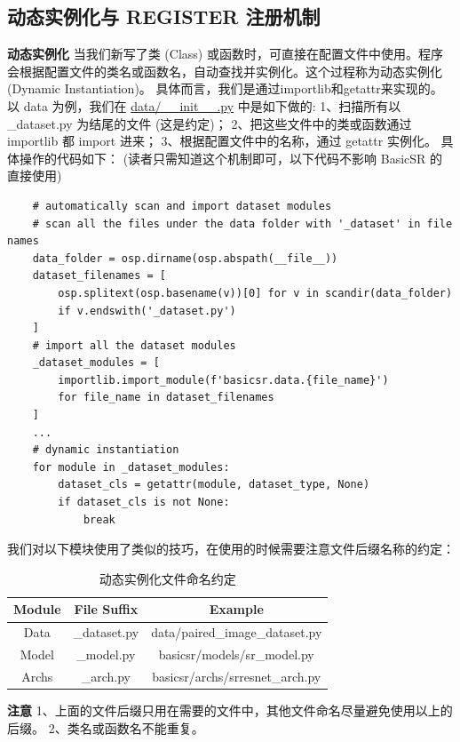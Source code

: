 \documentclass[../main.tex]{subfiles}
\begin{document}
    \subsection{动态实例化与 REGISTER 注册机制}
    \textbf{动态实例化}
    当我们新写了类 (Class) 或函数时，可直接在配置文件中使用。程序会根据配置文件的类名或函数名，自动查找并实例化。这个过程称为动态实例化 (Dynamic Instantiation)。
    具体而言，我们是通过importlib和getattr来实现的。以 data 为例，我们在 \href{https://github.com/XPixelGroup/BasicSR/blob/master/basicsr/data/__init__.py}{data/\_\_init\_\_.py} 中是如下做的:
    1、扫描所有以 \_dataset.py 为结尾的文件 (这是约定)；
    2、把这些文件中的类或函数通过 importlib 都 import 进来；
    3、根据配置文件中的名称，通过 getattr 实例化。
    具体操作的代码如下：
    (读者只需知道这个机制即可，以下代码不影响 BasicSR 的直接使用)
    \begin{verbatim}
    # automatically scan and import dataset modules
    # scan all the files under the data folder with '_dataset' in file names
    data_folder = osp.dirname(osp.abspath(__file__))
    dataset_filenames = [
        osp.splitext(osp.basename(v))[0] for v in scandir(data_folder)
        if v.endswith('_dataset.py')
    ]
    # import all the dataset modules
    _dataset_modules = [
        importlib.import_module(f'basicsr.data.{file_name}')
        for file_name in dataset_filenames
    ]
    ...
    # dynamic instantiation
    for module in _dataset_modules:
        dataset_cls = getattr(module, dataset_type, None)
        if dataset_cls is not None:
            break
    \end{verbatim}
    我们对以下模块使用了类似的技巧，在使用的时候需要注意文件后缀名称的约定：
    \begin{table}[h]
    \centering
    \begin{tabular}{|c|c|c|}
    \hline
    \textbf{Module} & \textbf{File Suffix} & \textbf{Example} \\ \hline
    Data & \_dataset.py & data/paired\_image\_dataset.py \\ \hline
    Model & \_model.py & basicsr/models/sr\_model.py \\ \hline
    Archs & \_arch.py & basicsr/archs/srresnet\_arch.py \\ \hline
    \end{tabular}
    \caption{动态实例化文件命名约定}
    \end{table}
    \begin{hl} %
    \textbf{注意}
    1、上面的文件后缀只用在需要的文件中，其他文件命名尽量避免使用以上的后缀。
    2、类名或函数名不能重复。
    \end{hl}
\end{document}
